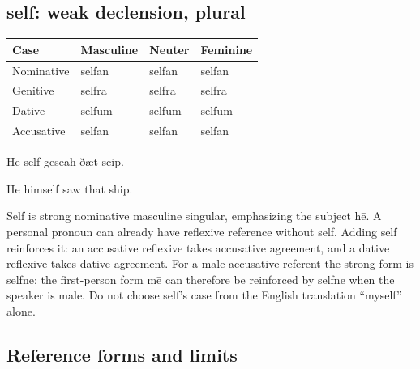 \subsection*{self: weak declension, plural}

\par\begingroup
\fontsize{10.5}{13.2}\selectfont
\setlength{\LTleft}{0pt}\setlength{\LTright}{\fill}
\noindent
\begin{tabular}{@{}>{\raggedright\arraybackslash}p{28.89mm}>{\raggedright\arraybackslash}p{28.89mm}>{\raggedright\arraybackslash}p{28.89mm}>{\raggedright\arraybackslash}p{28.89mm}@{}}
\toprule
\textbf{Case} & \textbf{Masculine} & \textbf{Neuter} & \textbf{Feminine} \\
\midrule
Nominative & selfan & selfan & selfan \\
Genitive & selfra & selfra & selfra \\
Dative & selfum & selfum & selfum \\
Accusative & selfan & selfan & selfan \\
\bottomrule
\end{tabular}
\par\endgroup

Hē self geseah ðæt scip.

He himself saw that ship.

Self is strong nominative masculine singular, emphasizing the subject hē. A personal pronoun can already have reflexive reference without self. Adding self reinforces it: an accusative reflexive takes accusative agreement, and a dative reflexive takes dative agreement. For a male accusative referent the strong form is selfne; the first-person form mē can therefore be reinforced by selfne when the speaker is male. Do not choose self’s case from the English translation “myself” alone.

\subsection*{Reference forms and limits}

